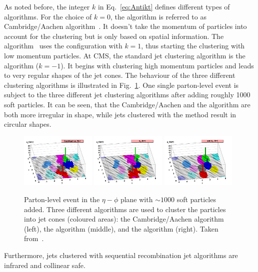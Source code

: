 As noted before, the integer $k$ in Eq.~\eqref{eq:Antikt} defines different types of algorithms.
For the choice of $k=0$, the algorithm is referred to as Cambridge/Aachen algorithm~\cite{bib:Cambridge_1997,bib:Cambridge_1998}.
It doesn't take the momentum of particles into account for the clustering but is only based on spatial information.
The \kt algorithm~\cite{bib:kT_algorithm_1993,bib:kT_algorithm_Ellis} uses the configuration with $k=1$, thus starting the clustering with low momentum particles.
At CMS, the standard jet clustering algorithm is the \antikt algorithm ($k=-1$). 
It begins with clustering high momentum particles and leads to very regular shapes of the jet cones.
The behaviour of the three different clustering algorithms is illustrated in Fig.~\ref{fig:ClusteringAlgorithms}. 
One single parton-level event is subject to the three different jet clustering algorithms after adding roughly 1000 soft particles. %
It can be seen, that the Cambridge/Aachen and the \kt algorithm are both more irregular in shape, while jets clustered with the \antikt method result in circular shapes.
\begin{figure}[!t]
  \centering
      \includegraphics[width=0.32\textwidth]{figures/experiment/ObjectReconstruction/herwig-parton-level-ev-cam.pdf}
      \includegraphics[width=0.32\textwidth]{figures/experiment/ObjectReconstruction/herwig-parton-level-ev-kt.pdf}
      \includegraphics[width=0.32\textwidth]{figures/experiment/ObjectReconstruction/herwig-parton-level-ev-antikt.pdf}
  \caption{Parton-level event in the $\eta - \phi$ plane with $\sim 1000$ soft particles added. Three different algorithms are used to cluster the particles into jet cones (coloured areas): the Cambridge/Aachen algorithm (left), the \kt algorithm (middle), and the \antikt algorithm (right). Taken from~\cite{bib:JetClustering_2008}.}  
  \label{fig:ClusteringAlgorithms}
\end{figure}
Furthermore, jets clustered with sequential recombination jet algorithms are infrared and collinear safe.

